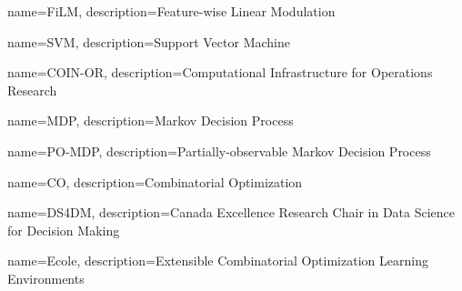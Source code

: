 {
        name=FiLM,
        description={Feature-wise Linear Modulation}
}

{
        name=SVM,
        description={Support Vector Machine}
}

{
        name=COIN-OR,
        description={Computational Infrastructure for Operations Research}
}

{
        name=MDP,
        description={Markov Decision Process}
}

{
        name=PO-MDP,
        description={Partially-observable Markov Decision Process}
}

{
        name=CO,
        description={Combinatorial Optimization}
}

{
        name=DS4DM,
        description={Canada Excellence Research Chair in Data Science for Decision Making}
}

{
        name=Ecole,
        description={Extensible Combinatorial Optimization Learning Environments}
}



